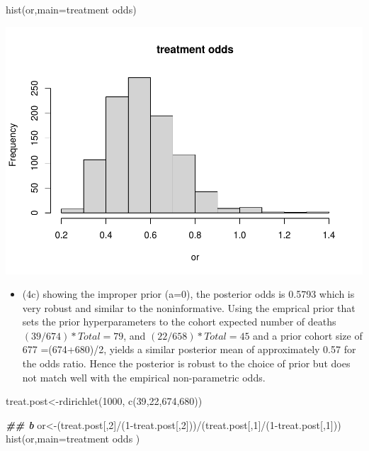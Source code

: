 \documentclass[
]{book}
\newenvironment{Shaded}{\begin{snugshade}}{\end{snugshade}}
\newcommand{\AttributeTok}[1]{\textcolor[rgb]{0.77,0.63,0.00}{#1}}
\newcommand{\DecValTok}[1]{\textcolor[rgb]{0.00,0.00,0.81}{#1}}
\newcommand{\DocumentationTok}[1]{\textcolor[rgb]{0.56,0.35,0.01}{\textbf{\textit{#1}}}}
\newcommand{\FunctionTok}[1]{\textcolor[rgb]{0.00,0.00,0.00}{#1}}
\newcommand{\NormalTok}[1]{#1}
\newcommand{\OtherTok}[1]{\textcolor[rgb]{0.56,0.35,0.01}{#1}}
\newcommand{\SpecialCharTok}[1]{\textcolor[rgb]{0.00,0.00,0.00}{#1}}
\newcommand{\StringTok}[1]{\textcolor[rgb]{0.31,0.60,0.02}{#1}}
\providecommand{\tightlist}{%
  \setlength{\itemsep}{0pt}\setlength{\parskip}{0pt}}
\theoremstyle{definition}
\theoremstyle{definition}
\theoremstyle{definition}
\theoremstyle{definition}
\theoremstyle{remark}
\begin{document}
\begin{Shaded}
\begin{Highlighting}[]
  \FunctionTok{hist}\NormalTok{(or,}\AttributeTok{main=}\StringTok{\textquotesingle{}treatment odds\textquotesingle{}}\NormalTok{)}
\end{Highlighting}
\end{Shaded}

\includegraphics{_main_files/figure-latex/unnamed-chunk-37-1.pdf}

\begin{itemize}
\tightlist
\item
  (4c) showing the improper prior (a=0), the posterior odds is 0.5793 which is very robust and similar to the noninformative. Using the emprical prior that sets the prior hyperparameters to the cohort expected number of deaths \((39/674)*Total = 79\), and \((22/658)*Total = 45\) and a prior cohort size of 677 =(674+680)/2, yields a similar posterior mean of approximately 0.57 for the odds ratio. Hence the posterior is robust to the choice of prior but does not match well with the empirical non-parametric odds.
\end{itemize}

\begin{Shaded}
\begin{Highlighting}[]
\NormalTok{ treat.post}\OtherTok{\textless{}{-}}\FunctionTok{rdirichlet}\NormalTok{(}\DecValTok{1000}\NormalTok{, }\FunctionTok{c}\NormalTok{(}\DecValTok{39}\NormalTok{,}\DecValTok{22}\NormalTok{,}\DecValTok{674}\NormalTok{,}\DecValTok{680}\NormalTok{))}
 
  
  \DocumentationTok{\#\# b}
\NormalTok{  or}\OtherTok{\textless{}{-}}\NormalTok{(treat.post[,}\DecValTok{2}\NormalTok{]}\SpecialCharTok{/}\NormalTok{(}\DecValTok{1}\SpecialCharTok{{-}}\NormalTok{treat.post[,}\DecValTok{2}\NormalTok{]))}\SpecialCharTok{/}\NormalTok{(treat.post[,}\DecValTok{1}\NormalTok{]}\SpecialCharTok{/}\NormalTok{(}\DecValTok{1}\SpecialCharTok{{-}}\NormalTok{treat.post[,}\DecValTok{1}\NormalTok{]))}
  \FunctionTok{hist}\NormalTok{(or,}\AttributeTok{main=}\StringTok{\textquotesingle{}treatment odds \textquotesingle{}}\NormalTok{)}
\end{Highlighting}
\end{Shaded}
\end{document}
